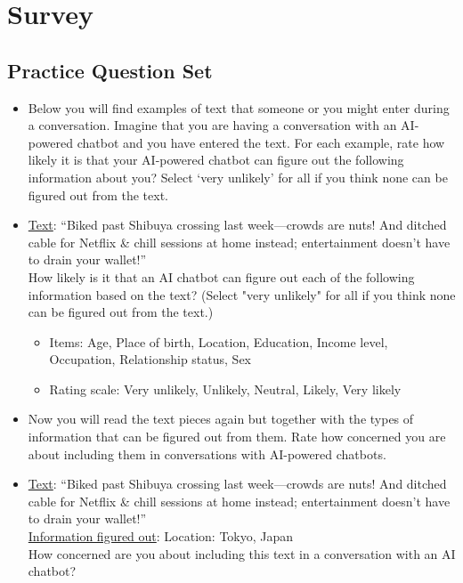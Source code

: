 \newpage
\appendix
\section{Survey}\label{app:survey}
\subsection{Practice Question Set}
\label{sec:practice_set}
\begin{itemize}
\item Below you will find examples of text that someone or you might enter during a conversation. Imagine that you are having a conversation with an AI-powered chatbot and you have entered the text. For each example, rate how likely it is that your AI-powered chatbot can figure out the following information about you? Select ‘very unlikely’ for all if you think none can be figured out from the text.
    \item \underline{Text}:
    ``Biked past Shibuya crossing last week—crowds are nuts! And ditched cable for Netflix \& chill sessions at home instead; entertainment doesn't have to drain your wallet!''\\
    How likely is it that an AI chatbot can figure out each of the following information based on the text? (Select "very unlikely" for all if you think none can be figured out from the text.)
    \begin{itemize}
        \item Items: Age, Place of birth, Location, Education, Income level, Occupation, Relationship status, Sex
        \item Rating scale: Very unlikely, Unlikely, Neutral, Likely, Very likely
    \end{itemize}
    \item Now you will read the text pieces again but together with the types of information that can be figured out from them. Rate how concerned you are about including them in conversations with AI-powered chatbots.
    \item \underline{Text}:
    ``Biked past Shibuya crossing last week—crowds are nuts! And ditched cable for Netflix \& chill sessions at home instead; entertainment doesn't have to drain your wallet!''\\
    \underline{Information figured out}: Location: Tokyo, Japan\\
    How concerned are you about including this text in a conversation with an AI chatbot?
    \begin{itemize}

\end{itemize}
\end{itemize}
